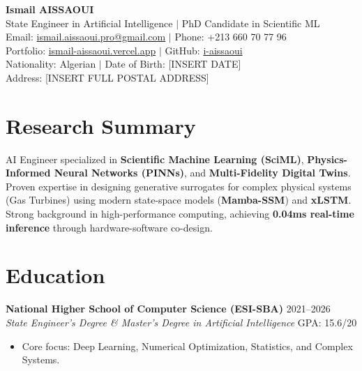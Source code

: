 \documentclass[a4paper,11pt]{article}
\begin{document}
\begin{center}
    {\Huge\bfseries\color{titleblue} Ismail AISSAOUI}\\[4pt]
    {\large State Engineer in Artificial Intelligence $|$ PhD Candidate in Scientific ML}\\[6pt]
    \normalsize
    Email: \href{mailto:ismail.aissaoui.pro@gmail.com}{ismail.aissaoui.pro@gmail.com} $|$ Phone: +213 660 70 77 96 \\
    Portfolio: \href{https://ismail-aissaoui.vercel.app}{ismail-aissaoui.vercel.app} $|$ GitHub: \href{https://github.com/i-aissaoui}{i-aissaoui} \\
    Nationality: Algerian $|$ Date of Birth: [INSERT DATE] \\
    Address: [INSERT FULL POSTAL ADDRESS]
\end{center}

\section{Research Summary}
AI Engineer specialized in \textbf{Scientific Machine Learning (SciML)}, \textbf{Physics-Informed Neural Networks (PINNs)}, and \textbf{Multi-Fidelity Digital Twins}. Proven expertise in designing generative surrogates for complex physical systems (Gas Turbines) using modern state-space models (\textbf{Mamba-SSM}) and \textbf{xLSTM}. Strong background in high-performance computing, achieving \textbf{0.04ms real-time inference} through hardware-software co-design.

\section{Education}
\textbf{National Higher School of Computer Science (ESI-SBA)} \hfill 2021--2026 \\
\textit{State Engineer's Degree \& Master's Degree in Artificial Intelligence} \hfill GPA: 15.6/20
\begin{itemize}
    \item Core focus: Deep Learning, Numerical Optimization, Statistics, and Complex Systems.
\end{itemize}
\end{document}
